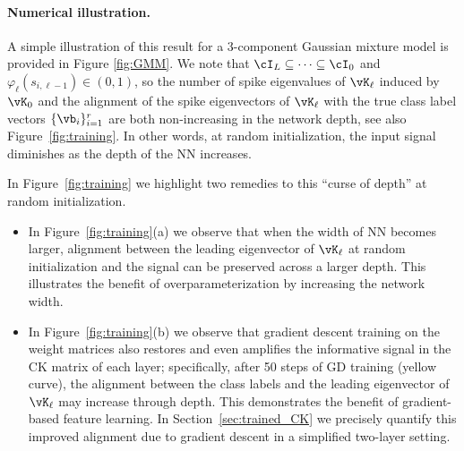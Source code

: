 \paragraph{Numerical illustration.}
A simple illustration of this result for a 3-component Gaussian mixture model
is provided in Figure \ref{fig:GMM}. We note that
$\cI_L \subseteq \cdots \subseteq \cI_0$ and $\varphi_\ell(s_{i,\ell-1})
\in (0,1)$, so the number of spike eigenvalues of $\vK_\ell$
induced by $\vK_0$ and the alignment of the spike eigenvectors of $\vK_\ell$
with the true class label vectors $\{\vb_i\}_{i=1}^r$ are both non-increasing in the network depth, see also Figure~\ref{fig:training}. In other words, at random initialization, the input signal diminishes as the depth of the NN increases. 

In Figure~\ref{fig:training} we highlight two remedies to this ``curse of depth'' at random initialization. 
\begin{itemize}[leftmargin=*]
    \item In Figure~\ref{fig:training}(a) we observe that when the width of NN becomes larger, alignment between the leading eigenvector of $\vK_\ell$ at random initialization and the signal can be preserved across a larger depth. This illustrates the benefit of overparameterization by increasing the network width. 
    \item In Figure~\ref{fig:training}(b) we observe that gradient descent training on the weight matrices also restores and even amplifies the informative signal in the CK matrix of each layer; specifically, after 50 steps of GD training (yellow curve), the alignment between the class labels and the leading eigenvector of $\vK_\ell$ may increase through depth. This demonstrates the benefit of gradient-based feature learning. In Section~\ref{sec:trained_CK} we precisely quantify this improved alignment due to gradient descent in a simplified two-layer setting. 
\end{itemize}

